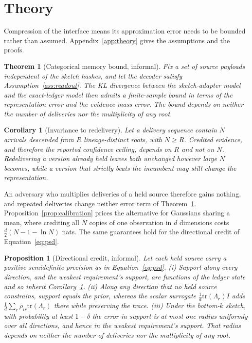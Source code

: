 \documentclass{article}
\newtheorem{theorem}{Theorem}
\newtheorem{proposition}{Proposition}
\newtheorem{corollary}{Corollary}
\begin{document}
\section{Theory}
\label{sec:theory}

Compression of the interface means its approximation error needs to be bounded
rather than assumed. Appendix~\ref{app:theory} gives the assumptions and the proofs.

\begin{theorem}[Categorical memory bound, informal]
\label{thm:categorical}
Fix a set of source payloads independent of the sketch hashes, and let the
decoder satisfy Assumption~\ref{ass:readout}. The KL divergence between the
sketch-adapter model and the exact-ledger model then admits a finite-sample
bound in terms of the representation error and the evidence-mass error. The
bound depends on neither the number of deliveries nor the multiplicity of any
root.
\end{theorem}

\begin{corollary}[Invariance to redelivery]
\label{cor:invariance}
Let a delivery sequence contain $N$ arrivals descended from $R$ lineage-distinct
roots, with $N \geq R$. Credited evidence, and therefore the reported confidence
ceiling, depends on $R$ and not on $N$. Redelivering a version already held
leaves both unchanged however large $N$ becomes, while a version that strictly
beats the incumbent may still change the representation.
\end{corollary}

An adversary who multiplies deliveries of a held source therefore gains nothing,
and repeated deliveries change neither error term of
Theorem~\ref{thm:categorical}. Proposition~\ref{prop:calibration} prices the
alternative for Gaussians sharing a mean, where crediting all $N$ copies of one
observation in $d$ dimensions costs $\tfrac{d}{2}(N - 1 - \ln N)$ nats. The same
guarantees hold for the directional credit of Equation~\ref{eq:psd}.

\begin{proposition}[Directional credit, informal]
\label{prop:directional}
Let each held source carry a positive semidefinite precision as in
Equation~\ref{eq:psd}. (i) Support along every direction, and the weakest
requirement's support, are functions of the ledger state and so inherit
Corollary~\ref{cor:invariance}. (ii) Along any direction that no held source
constrains, support equals the prior, whereas the scalar surrogate
$\tfrac{1}{d}\mathrm{tr}(\Lambda_r)I$ adds $\tfrac{1}{d}\sum_r
\rho_{ir}\mathrm{tr}(\Lambda_r)$ there while preserving the trace. (iii) Under
the bottom-$k$ sketch, with probability at least $1-\delta$ the error in support
is at most one radius uniformly over all directions, and hence in the weakest
requirement's support. That radius depends on neither the number of deliveries
nor the multiplicity of any root.
\end{proposition}
\end{document}
